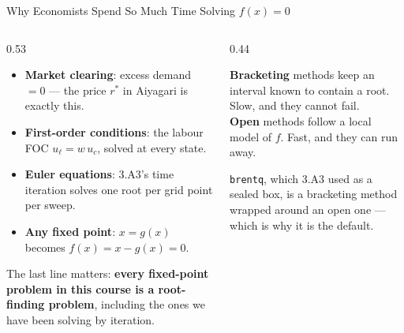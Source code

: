 \begin{frame}{Why Economists Spend So Much Time Solving $f(x)=0$}
\begin{columns}[T]
\begin{column}{0.53\textwidth}
\small
\begin{itemize}\footnotesize
  \item \textbf{Market clearing}: excess demand $=0$ --- the price $r^{*}$ in Aiyagari is exactly this.
  \item \textbf{First-order conditions}: the labour FOC $u_{\ell}=w\,u_{c}$, solved at every state.
  \item \textbf{Euler equations}: 3.A3's time iteration solves one root per grid point per sweep.
  \item \textbf{Any fixed point}: $x=g(x)$ becomes $f(x)=x-g(x)=0$.
\end{itemize}
\medskip
The last line matters: \textbf{every fixed-point problem in this course is a root-finding problem}, including the ones we have been solving by iteration.
\end{column}
\begin{column}{0.44\textwidth}
\begin{conceptbox}[title=\textbf{Two families}]\small
\textbf{Bracketing} methods keep an interval known to contain a root. Slow, and they cannot fail.\\[1mm]
\textbf{Open} methods follow a local model of $f$. Fast, and they can run away.
\end{conceptbox}
\medskip
\begin{examplebox}\footnotesize
\texttt{brentq}, which 3.A3 used as a sealed box, is a bracketing method wrapped around an open one --- which is why it is the default.
\end{examplebox}
\end{column}
\end{columns}
\vspace{1mm}
\end{frame}

